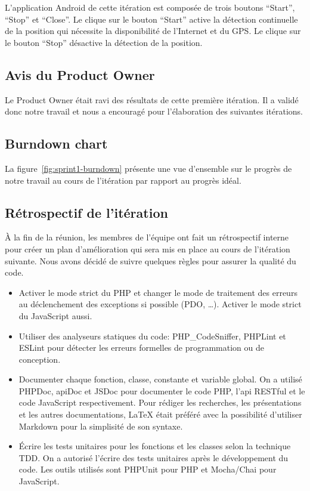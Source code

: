 L'application Android de cette itération est composée de trois boutons
``Start'', ``Stop'' et ``Close''.  Le clique sur le bouton ``Start'' active la
détection continuelle de la position qui nécessite la disponibilité de
l'Internet et du \acrshort{GPS}.  Le clique sur le bouton ``Stop'' désactive la
détection de la position.

\subsection{Avis du Product Owner}

Le Product Owner était ravi des résultats de cette première itération. Il a
validé donc notre travail et nous a encouragé pour l'élaboration des suivantes
itérations.

\subsection{Burndown chart}

La figure~\ref{fig:sprint1-burndown} présente une vue d'ensemble sur le progrès
de notre travail au cours de l'itération par rapport au progrès idéal.



\subsection{Rétrospectif de l'itération}

À la fin de la réunion, les membres de l'équipe ont fait un rétrospectif
interne pour créer un plan d'amélioration qui sera mis en place au cours de
l'itération suivante.  Nous avons décidé de suivre quelques règles pour assurer
la qualité du code.

\begin{itemize}
    \item Activer le mode strict du PHP et changer le mode de traitement des
        erreurs au déclenchement des exceptions si possible (PDO, \ldots).
        Activer le mode strict du JavaScript aussi.
    \item Utiliser des analyseurs statiques du code: PHP\_CodeSniffer, PHPLint
        et ESLint pour détecter les erreurs formelles de programmation ou de
        conception.
    \item Documenter chaque fonction, classe, constante et variable global. On
        a utilisé PHPDoc, apiDoc et JSDoc pour documenter le code PHP, l'api
        RESTful et le code JavaScript respectivement. Pour rédiger les
        recherches, les présentations et les autres documentations, \LaTeX{}
        était préféré avec la possibilité d'utiliser Markdown pour la
        simplisité de son syntaxe.
    \item Écrire les tests unitaires pour les fonctions et les classes selon la
        technique \acrshort{TDD}. On a autorisé l'écrire des tests unitaires
        après le développement du code. Les outils utilisés sont PHPUnit pour
        PHP et Mocha/Chai pour JavaScript.
\end{itemize}

